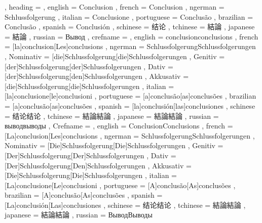   {
    , heading =   {
                    , english     = Conclusion
                    , french      = Conclusion
                    , ngerman     = Schlussfolgerung
                    , italian     = Conclusione
                    , portuguese  = Conclusão
                    , brazilian   = Conclusão
                    , spanish     = Conclusión
                    , schinese    = 结论
                    , tchinese    = 結論
                    , japanese    = 結論
                    , russian     = Вывод
                  }
    , crefname =  {
                    , english     = {conclusion}{conclusions}
                    , french      = [la]{conclusion}[Les]{conclusions}
                    , ngerman     = { {Schlussfolgerung}{Schlussfolgerungen}
                                      , Nominativ = [die]{Schlussfolgerung}[die]{Schlussfolgerungen}
                                      , Genitiv   = [der]{Schlussfolgerung}[der]{Schlussfolgerungen}
                                      , Dativ     = [der]{Schlussfolgerung}[den]{Schlussfolgerungen}
                                      , Akkusativ = [die]{Schlussfolgerung}[die]{Schlussfolgerungen}
                                    }
                    , italian     = [la]{conclusione}[le]{conclusioni}
                    , portuguese  = [a]{conclusão}[as]{conclusões}
                    , brazilian   = [a]{conclusão}[as]{conclusões}
                    , spanish     = [la]{conclusión}[las]{conclusiones}
                    , schinese    = {结论}{结论}
                    , tchinese    = {結論}{結論}
                    , japanese    = {結論}{結論}
                    , russian     = {вывод}{выводы}
                  }
    , Crefname =  {
                    , english     = {Conclusion}{Conclusions}
                    , french      = [La]{conclusion}[Les]{conclusions}
                    , ngerman     = { {Schlussfolgerung}{Schlussfolgerungen}
                                      , Nominativ = [Die]{Schlussfolgerung}[Die]{Schlussfolgerungen}
                                      , Genitiv   = [Der]{Schlussfolgerung}[Der]{Schlussfolgerungen}
                                      , Dativ     = [Der]{Schlussfolgerung}[Den]{Schlussfolgerungen}
                                      , Akkusativ = [Die]{Schlussfolgerung}[Die]{Schlussfolgerungen}
                                    }
                    , italian     = [La]{conclusione}[Le]{conclusioni}
                    , portuguese  = [A]{conclusão}[As]{conclusões}
                    , brazilian   = [A]{conclusão}[As]{conclusões}
                    , spanish     = [La]{conclusión}[Las]{conclusiones}
                    , schinese    = {结论}{结论}
                    , tchinese    = {結論}{結論}
                    , japanese    = {結論}{結論}
                    , russian     = {Вывод}{Выводы}
                  }
  }

